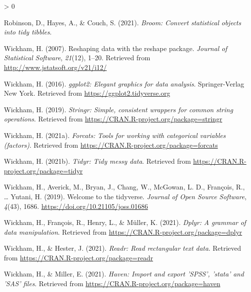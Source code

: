 \documentclass[
  english,
  man]{apa6}
\newlength{\cslhangindent}
\newenvironment{CSLReferences}[2] %
 {%
  \setlength{\parindent}{0pt}
  \ifodd #1 \everypar{\setlength{\hangindent}{\cslhangindent}}\ignorespaces\fi
  \ifnum #2 > 0
  \setlength{\parskip}{#2\baselineskip}
  \fi
 }%
 {}
\begin{document}
\begin{CSLReferences}{1}{0}
\leavevmode\hypertarget{ref-R-broom}{}%
Robinson, D., Hayes, A., \& Couch, S. (2021). \emph{Broom: Convert statistical objects into tidy tibbles}.

\leavevmode\hypertarget{ref-R-reshape2}{}%
Wickham, H. (2007). Reshaping data with the {reshape} package. \emph{Journal of Statistical Software}, \emph{21}(12), 1--20. Retrieved from \url{http://www.jstatsoft.org/v21/i12/}

\leavevmode\hypertarget{ref-R-ggplot2}{}%
Wickham, H. (2016). \emph{ggplot2: Elegant graphics for data analysis}. Springer-Verlag New York. Retrieved from \url{https://ggplot2.tidyverse.org}

\leavevmode\hypertarget{ref-R-stringr}{}%
Wickham, H. (2019). \emph{Stringr: Simple, consistent wrappers for common string operations}. Retrieved from \url{https://CRAN.R-project.org/package=stringr}

\leavevmode\hypertarget{ref-R-forcats}{}%
Wickham, H. (2021a). \emph{Forcats: Tools for working with categorical variables (factors)}. Retrieved from \url{https://CRAN.R-project.org/package=forcats}

\leavevmode\hypertarget{ref-R-tidyr}{}%
Wickham, H. (2021b). \emph{Tidyr: Tidy messy data}. Retrieved from \url{https://CRAN.R-project.org/package=tidyr}

\leavevmode\hypertarget{ref-R-tidyverse}{}%
Wickham, H., Averick, M., Bryan, J., Chang, W., McGowan, L. D., François, R., \ldots{} Yutani, H. (2019). Welcome to the {tidyverse}. \emph{Journal of Open Source Software}, \emph{4}(43), 1686. \url{https://doi.org/10.21105/joss.01686}

\leavevmode\hypertarget{ref-R-dplyr}{}%
Wickham, H., François, R., Henry, L., \& Müller, K. (2021). \emph{Dplyr: A grammar of data manipulation}. Retrieved from \url{https://CRAN.R-project.org/package=dplyr}

\leavevmode\hypertarget{ref-R-readr}{}%
Wickham, H., \& Hester, J. (2021). \emph{Readr: Read rectangular text data}. Retrieved from \url{https://CRAN.R-project.org/package=readr}

\leavevmode\hypertarget{ref-R-haven}{}%
Wickham, H., \& Miller, E. (2021). \emph{Haven: Import and export 'SPSS', 'stata' and 'SAS' files}. Retrieved from \url{https://CRAN.R-project.org/package=haven}

\end{CSLReferences}

\endgroup
\end{document}
